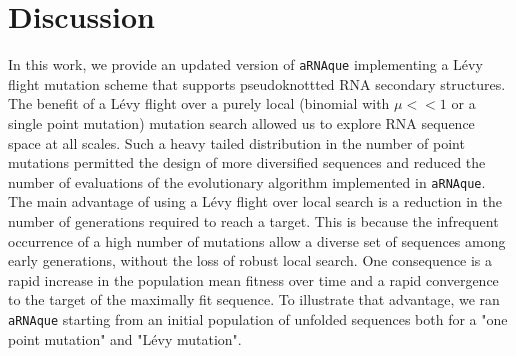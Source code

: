 
\section*{Discussion}

In this work, we provide an updated version of \texttt{aRNAque} implementing a Lévy flight mutation scheme that supports pseudoknottted RNA secondary structures. The benefit of a Lévy flight over a purely local (binomial with $\mu<<1$ or a single point mutation) mutation search allowed us to explore RNA sequence space at all scales. Such a heavy tailed distribution in the number of point mutations permitted the design of more diversified sequences and reduced the number of evaluations of the evolutionary algorithm implemented in \texttt{aRNAque}. The main advantage of using a Lévy flight over local search is a reduction in the number of generations required to reach a target. This is because the infrequent occurrence of a high number of mutations allow a diverse set of sequences among early generations, without the loss of robust local search. One consequence is a rapid increase in the population mean fitness over time and a rapid convergence to the target of the maximally fit sequence. To illustrate that advantage, we ran \texttt{aRNAque} starting from an initial population of unfolded sequences both for a "one point mutation" and "Lévy mutation".

